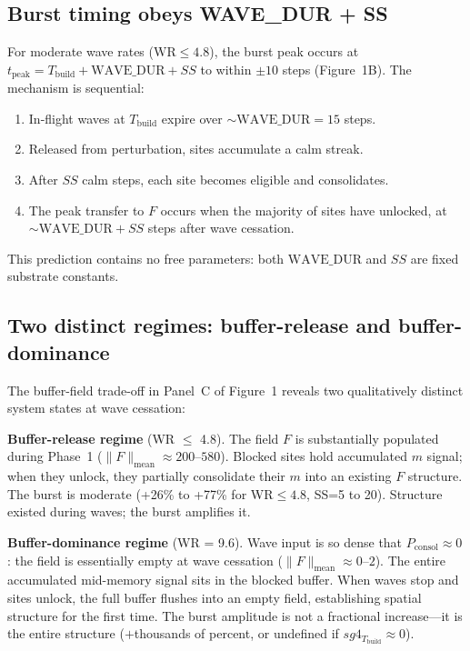 \documentclass[11pt]{article}
\begin{document}
\subsection{Burst timing obeys WAVE\_DUR + SS}

For moderate wave rates ($\mathrm{WR} \leq 4.8$), the burst peak occurs at
$t_{\mathrm{peak}} = T_{\mathrm{build}} + \mathrm{WAVE\_DUR} + SS$
to within $\pm 10$ steps (Figure~1B).
The mechanism is sequential:
\begin{enumerate}
  \item In-flight waves at $T_{\mathrm{build}}$ expire over $\sim \mathrm{WAVE\_DUR} = 15$ steps.
  \item Released from perturbation, sites accumulate a calm streak.
  \item After $SS$ calm steps, each site becomes eligible and consolidates.
  \item The peak transfer to $F$ occurs when the majority of sites have unlocked,
    at $\sim \mathrm{WAVE\_DUR} + SS$ steps after wave cessation.
\end{enumerate}

This prediction contains no free parameters: both $\mathrm{WAVE\_DUR}$ and $SS$ are
fixed substrate constants.

\subsection{Two distinct regimes: buffer-release and buffer-dominance}

The buffer-field trade-off in Panel~C of Figure~1 reveals two qualitatively
distinct system states at wave cessation:

\textbf{Buffer-release regime} (WR $\leq$ 4.8).
The field $F$ is substantially populated during Phase~1
($\|F\|_{\mathrm{mean}} \approx 200$--$580$).
Blocked sites hold accumulated $m$ signal;
when they unlock, they partially consolidate their $m$ into an existing $F$ structure.
The burst is moderate (+26\% to +77\% for WR$\leq 4.8$, SS=5 to 20).
Structure existed during waves; the burst amplifies it.

\textbf{Buffer-dominance regime} (WR = 9.6).
Wave input is so dense that $P_{\mathrm{consol}} \approx 0$:
the field is essentially empty at wave cessation ($\|F\|_{\mathrm{mean}} \approx 0$--$2$).
The entire accumulated mid-memory signal sits in the blocked buffer.
When waves stop and sites unlock, the full buffer flushes into an empty field,
establishing spatial structure for the first time.
The burst amplitude is not a fractional increase---it is the entire structure
($+$thousands of percent, or undefined if $sg4_{T_{\mathrm{build}}} \approx 0$).
\end{document}
